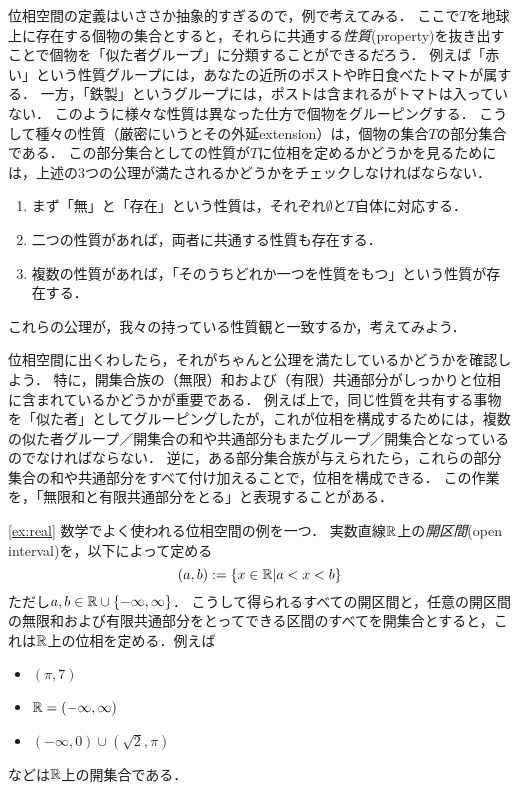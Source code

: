 \documentclass[11pt,a4paper]{jsarticle}
\begin{document}
\begin{example}
位相空間の定義はいささか抽象的すぎるので，例で考えてみる．
ここで$T$を地球上に存在する個物の集合とすると，それらに共通する\emph{性質}(property)を抜き出すことで個物を「似た者グループ」に分類することができるだろう．
例えば「赤い」という性質グループには，あなたの近所のポストや昨日食べたトマトが属する．
一方，「鉄製」というグループには，ポストは含まれるがトマトは入っていない．
このように様々な性質は異なった仕方で個物をグルーピングする．
こうして種々の性質（厳密にいうとその外延extension）は，個物の集合$T$の部分集合である．
この部分集合としての性質が$T$に位相を定めるかどうかを見るためには，上述の3つの公理が満たされるかどうかをチェックしなければならない．
\begin{enumerate}
 \item まず「無」と「存在」という性質は，それぞれ$\emptyset$と$T$自体に対応する．
 \item 二つの性質があれば，両者に共通する性質も存在する．
 \item 複数の性質があれば，「そのうちどれか一つを性質をもつ」という性質が存在する．
\end{enumerate}
これらの公理が，我々の持っている性質観と一致するか，考えてみよう．
\end{example}


位相空間に出くわしたら，それがちゃんと公理を満たしているかどうかを確認しよう．
特に，開集合族の（無限）和および（有限）共通部分がしっかりと位相に含まれているかどうかが重要である．
例えば上で，同じ性質を共有する事物を「似た者」としてグルーピングしたが，これが位相を構成するためには，複数の似た者グループ／開集合の和や共通部分もまたグループ／開集合となっているのでなければならない．
逆に，ある部分集合族が与えられたら，これらの部分集合の和や共通部分をすべて付け加えることで，位相を構成できる．
この作業を，「無限和と有限共通部分をとる」と表現することがある．


\begin{example}
\ref{ex:real}
数学でよく使われる位相空間の例を一つ．
実数直線$\mathbb{R}$上の\emph{開区間}(open interval)を，以下によって定める
\[
  (a, b) := \{ x \in \mathbb{R}| a < x < b \}
\]
ただし$a, b \in \mathbb{R} \cup \{-\infty, \infty\}$．
こうして得られるすべての開区間と，任意の開区間の無限和および有限共通部分をとってできる区間のすべてを開集合とすると，これは$\mathbb{R}$上の位相を定める．例えば
\begin{itemize}
 \item $(\pi,7)$
 \item $\mathbb{R} = (-\infty, \infty)$
 \item $(-\infty, 0) \cup (\sqrt{2}, \pi)$ 
\end{itemize}
などは$\mathbb{R}$上の開集合である．
\end{example}
\end{document}
